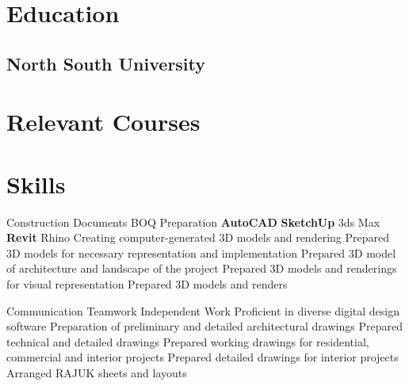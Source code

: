  

\begin{minipage}[t]{0.36\textwidth}
    \section{Education} %
      \subsection{North South University}
    \sectionsep

    \section{Relevant Courses} %
      
    \sectionsep

    \section{Skills} 
      Construction Documents \textbullet{} BOQ Preparation \textbullet{} \textbf{AutoCAD} \textbullet{} \textbf{SketchUp} \textbullet{} 3ds Max \textbullet{} \textbf{Revit} \textbullet{} Rhino \textbullet{} Creating computer-generated 3D models and rendering \textbullet{} Prepared 3D models for necessary representation and implementation \textbullet{} Prepared 3D model of architecture and landscape of the project \textbullet{} Prepared 3D models and renderings for visual representation \textbullet{} Prepared 3D models and renders \\
    \skillsVSpace

      Communication \textbullet{} Teamwork \textbullet{} Independent Work \textbullet{} Proficient in diverse digital design software \textbullet{} Preparation of preliminary and detailed architectural drawings \textbullet{} Prepared technical and detailed drawings \textbullet{} Prepared working drawings for residential, commercial and interior projects \textbullet{} Prepared detailed drawings for interior projects \textbullet{} Arranged RAJUK sheets and layouts \\
    \skillsVSpace
    \sectionsep


\end{minipage}
